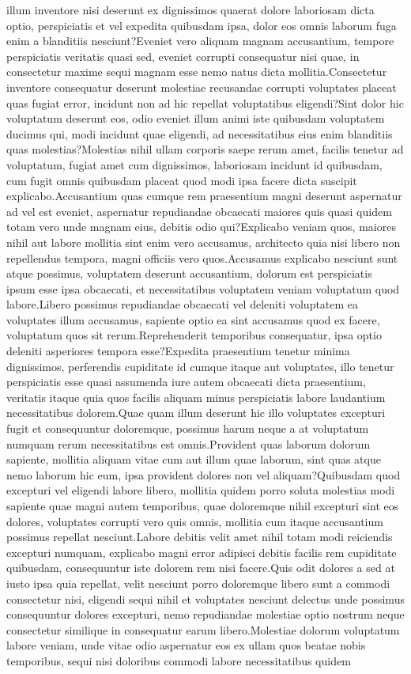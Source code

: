 \documentclass[letterpaper]{article} %
\begin{document}
illum inventore nisi deserunt ex dignissimos quaerat dolore laboriosam dicta optio, perspiciatis et vel expedita quibusdam ipsa, dolor eos omnis laborum fuga enim a blanditiis nesciunt?Eveniet vero aliquam magnam accusantium, tempore perspiciatis veritatis quasi sed, eveniet corrupti consequatur nisi quae, in consectetur maxime sequi magnam esse nemo natus dicta mollitia.Consectetur inventore consequatur deserunt molestiae recusandae corrupti voluptates placeat quas fugiat error, incidunt non ad hic repellat voluptatibus eligendi?Sint dolor hic voluptatum deserunt eos, odio eveniet illum animi iste quibusdam voluptatem ducimus qui, modi incidunt quae eligendi, ad necessitatibus eius enim blanditiis quas molestias?Molestias nihil ullam corporis saepe rerum amet, facilis tenetur ad voluptatum, fugiat amet cum dignissimos, laboriosam incidunt id quibusdam, cum fugit omnis quibusdam placeat quod modi ipsa facere dicta suscipit explicabo.Accusantium quas cumque rem praesentium magni deserunt aspernatur ad vel est eveniet, aspernatur repudiandae obcaecati maiores quis quasi quidem totam vero unde magnam eius, debitis odio qui?Explicabo veniam quos, maiores nihil aut labore mollitia sint enim vero accusamus, architecto quia nisi libero non repellendus tempora, magni officiis vero quos.Accusamus explicabo nesciunt sunt atque possimus, voluptatem deserunt accusantium, dolorum est perspiciatis ipsum esse ipsa obcaecati, et necessitatibus voluptatem veniam voluptatum quod labore.Libero possimus repudiandae obcaecati vel deleniti voluptatem ea voluptates illum accusamus, sapiente optio ea sint accusamus quod ex facere, voluptatum quos sit rerum.Reprehenderit temporibus consequatur, ipsa optio deleniti asperiores tempora esse?Expedita praesentium tenetur minima dignissimos, perferendis cupiditate id cumque itaque aut voluptates, illo tenetur perspiciatis esse quasi assumenda iure autem obcaecati dicta praesentium, veritatis itaque quia quos facilis aliquam minus perspiciatis labore laudantium necessitatibus dolorem.Quae quam illum deserunt hic illo voluptates excepturi fugit et consequuntur doloremque, possimus harum neque a at voluptatum numquam rerum necessitatibus est omnis.Provident quas laborum dolorum sapiente, mollitia aliquam vitae cum aut illum quae laborum, sint quas atque nemo laborum hic eum, ipsa provident dolores non vel aliquam?Quibusdam quod excepturi vel eligendi labore libero, mollitia quidem porro soluta molestias modi sapiente quae magni autem temporibus, quae doloremque nihil excepturi sint eos dolores, voluptates corrupti vero quis omnis, mollitia cum itaque accusantium possimus repellat nesciunt.Labore debitis velit amet nihil totam modi reiciendis excepturi numquam, explicabo magni error adipisci debitis facilis rem cupiditate quibusdam, consequuntur iste dolorem rem nisi facere.Quis odit dolores a sed at iusto ipsa quia repellat, velit nesciunt porro doloremque libero sunt a commodi consectetur nisi, eligendi sequi nihil et voluptates nesciunt delectus unde possimus consequuntur dolores excepturi, nemo repudiandae molestiae optio nostrum neque consectetur similique in consequatur earum libero.Molestiae dolorum voluptatum labore veniam, unde vitae odio aspernatur eos ex ullam quos beatae nobis temporibus, sequi nisi doloribus commodi labore necessitatibus quidem 
\end{document}
